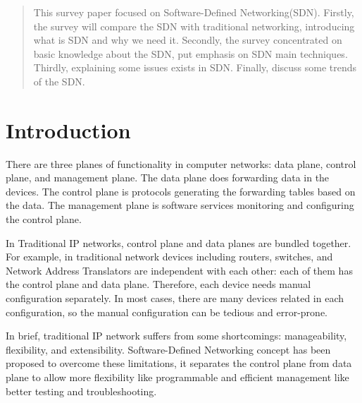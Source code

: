 \documentclass[conference]{IEEEtran}
\begin{document}
\begin{abstract}
This survey paper focused on Software-Defined Networking(SDN). Firstly, the survey will compare the SDN with traditional networking, introducing what is SDN and why we need it. Secondly, the survey concentrated on basic knowledge about the SDN, put emphasis on SDN main techniques. Thirdly, explaining some issues exists in SDN. Finally, discuss some trends of the SDN.
\end{abstract}





%
\IEEEpeerreviewmaketitle



\section{Introduction}
There are three planes of functionality in computer networks: data plane, control plane, and management plane. The data plane does forwarding data in the devices. The control plane is protocols generating the forwarding tables based on the data. The management plane is software services monitoring and configuring the control plane.

In Traditional IP networks, control plane and data planes are bundled together. For example, in traditional network devices including routers, switches, and Network Address Translators are independent with each other: each of them has the control plane and data plane. Therefore, each device needs manual configuration separately. In most cases, there are many devices related in each configuration, so the manual configuration can be tedious and error-prone.

In brief, traditional IP network suffers from some shortcomings: manageability, flexibility, and extensibility. 
Software-Defined Networking concept has been proposed to overcome these limitations, it separates the control plane from data plane to allow more flexibility like programmable and efficient management like better testing and troubleshooting.  
\end{document}
